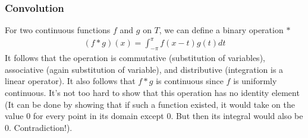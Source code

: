 \documentclass[12pt, titlepage]{article}
\newtheorem{prop}[thm]{Proposition}
\theoremstyle{definition}
\newcommand{\vep}{\varepsilon}
\begin{document}
\subsubsection{Convolution}
For two continuous functions $f$ and $g$ on $T$, we can define a binary operation $\ast$
\begin{align*}
    (f \ast g)(x) = \int_{-\pi}^{\pi} f(x-t) g(t) dt
\end{align*}
It follows that the operation is commutative (substitution of variables), associative (again substitution of variable), and distributive (integration is a linear operator). It also follows that $f \ast g$ is continuous since $f$ is uniformly continuous. It's not too hard to show that this operation has no identity element (It can be done by showing that if such a function existed, it would take on the value $0$ for every point in its domain except $0$. But then its integral would also be $0$. Contradiction!).
%
%    
%    
\end{document}
